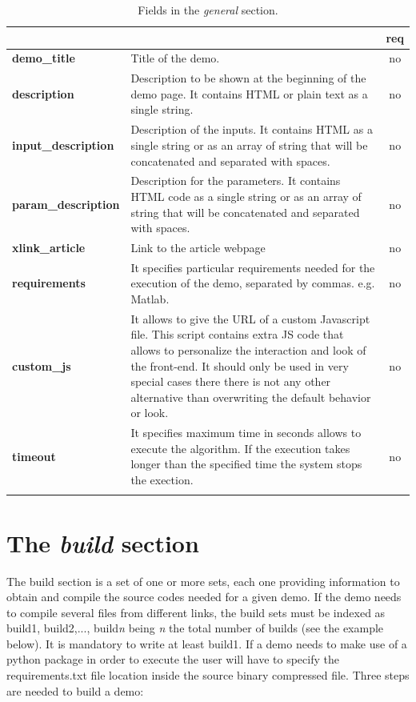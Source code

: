 % 
\begin{longtable}{|>{\bf}L{\linewidth}|L{\linewidth}|c|}
\hline
      &  & {\bf req} 
\tabularnewline \hline \hline
 demo\_title         & Title of the demo. & no\\ \hline
 description         & Description to be shown at the beginning of the demo page. It contains HTML or plain text as a single string. & no \\ \hline
 input\_description  & Description of the inputs. It contains HTML as a single string or as an array of string that will be concatenated and separated with spaces. & no \\ \hline
 param\_description  & Description for the parameters. It contains HTML code as a single string or as an array of string that will be concatenated and separated with spaces. & no
\\ \hline
 xlink\_article     & Link to the article webpage & no  \\ \hline
 requirements 	    & It specifies particular requirements needed for the execution of the demo, separated by commas. e.g. Matlab. & no \\ \hline
 custom\_js 	    & It allows to give the URL of a custom Javascript file. This script contains extra JS code that allows to personalize the interaction and look of the front-end. It should only be used in very special cases there there is not any other alternative than overwriting the default behavior or look. & no \\ \hline
 timeout 	    & It specifies maximum time in seconds allows to execute the algorithm. If the execution takes longer than the specified time the system stops the exection. & no \\ \hline
\caption{Fields in the \emph{general} section.}
\end{longtable}

\section{The \emph{build} section}

The build section is a set of one or more sets, each one providing information to obtain and compile the source codes needed for a given demo. If the demo needs to compile several files from different links, the build sets must be indexed as build1, build2,..., build\textit{n} being \textit{n} the total number of builds (see the example below). It is mandatory to write at least build1. If a demo needs to make use of a python package in order to execute the user will have to specify the requirements.txt file location inside the source binary compressed file. Three steps are needed to build a demo: 

